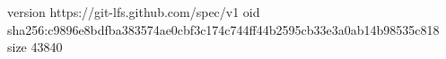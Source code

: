 version https://git-lfs.github.com/spec/v1
oid sha256:c9896e8bdfba383574ae0cbf3c174c744ff44b2595cb33e3a0ab14b98535c818
size 43840
